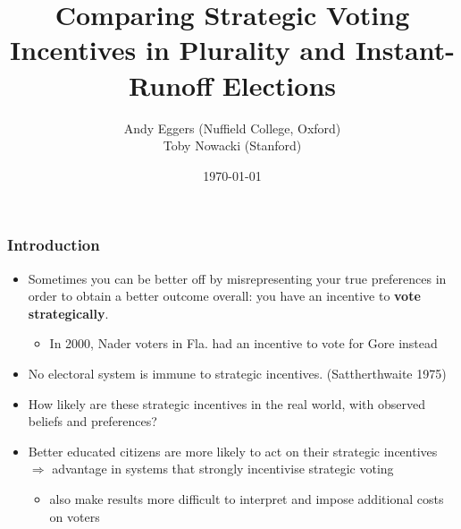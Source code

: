 \documentclass[10pt, en-GB]{beamer}
\title{Comparing Strategic Voting Incentives in Plurality and Instant-Runoff Elections}
\subtitle{}
\date{\today}
\author{Andy Eggers (Nuffield College, Oxford) \\ Toby Nowacki (Stanford)}
\begin{document}
\maketitle



\begin{frame}[t]\frametitle{Introduction}
    \begin{itemize}[<+->]
    	\item Sometimes you can be better off by misrepresenting your true preferences in order to obtain a better outcome overall: you have an incentive to \textbf{vote strategically}.
    	\begin{itemize}
    		\item {\color{gray} In 2000, Nader voters in Fla. had an incentive to vote for Gore instead}
    	\end{itemize}
    	\item No electoral system is immune to strategic incentives. (Sattherthwaite 1975)
    	\item How likely are these strategic incentives in the real world, with observed beliefs and preferences?
    	\item Better educated citizens are more likely to act on their strategic incentives $\Rightarrow$ advantage in systems that strongly incentivise strategic voting
    	\begin{itemize}
    		\item {\color{gray} also make results more difficult to interpret and impose additional costs on voters}
    	\end{itemize}
    \end{itemize}
\end{frame}
\end{document}
